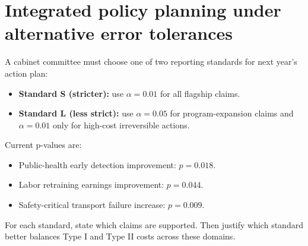 	\section{Integrated policy planning under alternative error tolerances}
	A cabinet committee must choose one of two reporting standards for next year's action plan:
	\begin{itemize}
		\item \textbf{Standard S (stricter):} use \(\alpha=0.01\) for all flagship claims.
		\item \textbf{Standard L (less strict):} use \(\alpha=0.05\) for program-expansion claims and \(\alpha=0.01\) only for high-cost irreversible actions.
	\end{itemize}
	Current p-values are:
	\begin{itemize}
		\item Public-health early detection improvement: \(p=0.018\).
		\item Labor retraining earnings improvement: \(p=0.044\).
		\item Safety-critical transport failure increase: \(p=0.009\).
	\end{itemize}
	For each standard, state which claims are supported. Then justify which standard better balances Type I and Type II costs across these domains.
	
	\begin{center}
		\hspace{0.5cm}
		\hspace{0.5cm}
	\end{center}
	
	\begin{center}
		\hspace{0.5cm}
		\hspace{0.5cm}
	\end{center}
	

